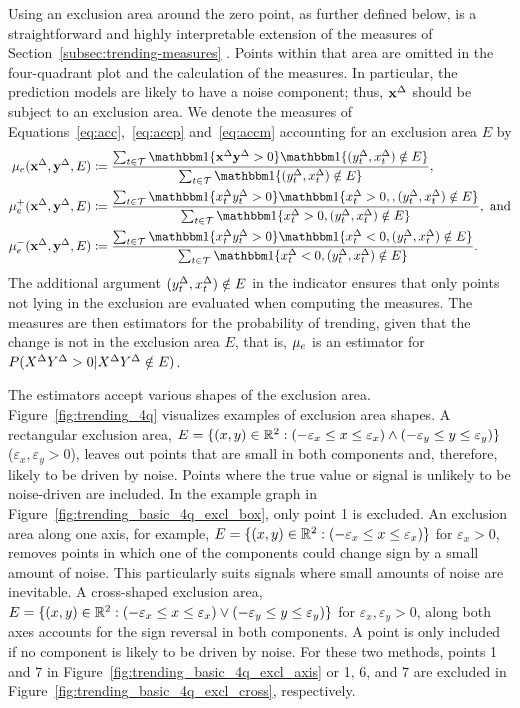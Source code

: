 Using an exclusion area around the zero point, as further defined below, is a straightforward and highly interpretable extension of the measures of Section~\ref{subsec:trending-measures} \parencite[see, e.g.,][]{Saugel2015,Critchley2010}.
Points within that area are omitted in the four-quadrant plot and the calculation of the measures.
In particular, the prediction models are likely to have a noise component; thus, $\mathbf{x}^{\Delta}$ should be subject to an exclusion area.
We denote the measures of Equations~\eqref{eq:acc},~\eqref{eq:accp} and~\eqref{eq:accm} accounting for an exclusion area $E$ by
\begin{align}
    \acceps (\diffx, \diffy, E) &\coloneqq \frac{\sum_{t \in \mathcal{T}} \ind{\diffx \diffy > 0} \ind{(\diffyt, \diffxt) \notin E}}{\sum_{t \in \mathcal{T}} \ind{(\diffyt, \diffxt) \notin E}},\label{eq:acceps}\\
    \accpeps (\diffx, \diffy, E) &\coloneqq \frac{\sum_{t \in \mathcal{T}} \ind{\diffxt \diffyt > 0} \ind{\diffxt > 0, , (\diffyt, \diffxt) \notin E}}{\sum_{t \in \mathcal{T}} \ind{\diffxt > 0, (\diffyt, \diffxt) \notin E}}, \ \text{and} \label{eq:accpeps}\\
    \accmeps (\diffx, \diffy, E) &\coloneqq \frac{\sum_{t \in \mathcal{T}} \ind{\diffxt \diffyt > 0} \ind{\diffxt < 0, (\diffyt, \diffxt) \notin E}}{\sum_{t \in \mathcal{T}} \ind{\diffxt < 0, (\diffyt, \diffxt) \notin E}}. \label{eq:accmeps}
\end{align}
The additional argument $(y^{\Delta}_{t}, x^{\Delta}_{t}) \notin E$ in the indicator ensures that only points not lying in the exclusion are evaluated when computing the measures.
The measures are then estimators for the probability of trending, given that the change is not in the exclusion area $E$, that is, $\mu_{e}$ is an estimator for $P(X^{\Delta} Y^{\Delta} > 0 | X^{\Delta} Y^{\Delta} \notin E)$.

The estimators accept various shapes of the exclusion area.
Figure~\ref{fig:trending_4q} visualizes examples of exclusion area shapes.
A rectangular exclusion area, $E = \{(x, y) \in \mathbb{R}^2: (-\varepsilon_x \leq x \leq \varepsilon_x) \land (-\varepsilon_y \leq y \leq \varepsilon_y) \}$ ($\varepsilon_x, \varepsilon_y > 0$), leaves out points that are small in both components and, therefore, likely to be driven by noise.
Points where the true value or signal is unlikely to be noise-driven are included.
In the example graph in Figure~\ref{fig:trending_basic_4q_excl_box}, only point 1 is excluded.
An exclusion area along one axis, for example, $E = \{(x, y) \in \mathbb{R}^2: (-\varepsilon_x \leq x \leq \varepsilon_x)\}$ for $\varepsilon_x > 0$, removes points in which one of the components could change sign by a small amount of noise.
This particularly suits signals where small amounts of noise are inevitable.
A cross-shaped exclusion area, $E = \{(x, y) \in \mathbb{R}^2: (-\varepsilon_x \leq x \leq \varepsilon_x) \lor (-\varepsilon_y \leq y \leq \varepsilon_y) \}$ for $\varepsilon_x, \varepsilon_y > 0$, along both axes accounts for the sign reversal in both components.
A point is only included if no component is likely to be driven by noise.
For these two methods, points 1 and 7 in Figure~\ref{fig:trending_basic_4q_excl_axis} or 1, 6, and 7 are excluded in Figure~\ref{fig:trending_basic_4q_excl_cross}, respectively.

